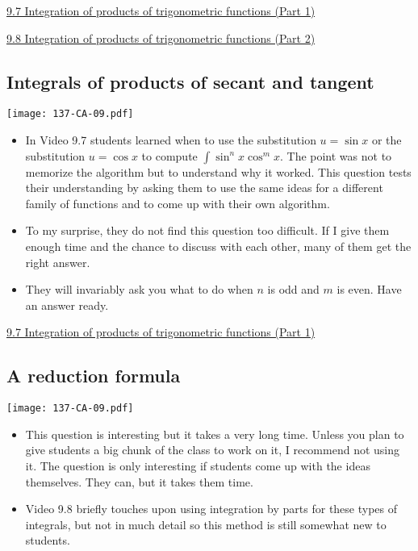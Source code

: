 \documentclass[11pt]{article}
\newcommand {\DS} [1] {${\displaystyle #1}$}
\newcommand{\nl}{\hfill \vspace{-1.1\baselineskip}} %
\newcommand{\vvii}{\hspace{8mm} \href{https://www.youtube.com/watch?v=8TCGSagLskc&list=PLlwePzQY_wW_DPAQSBjQmMs0hF8T7yVkF&index=7}{9.7 Integration of products of trigonometric functions (Part 1)}}
\newcommand{\vviii}{\hspace{8mm} \href{https://www.youtube.com/watch?v=zrPCAP9-0wo&list=PLlwePzQY_wW_DPAQSBjQmMs0hF8T7yVkF&index=8}{9.8 Integration of products of trigonometric functions (Part 2)}}
\begin{document}
\begin{videos}
\vvii

\vviii
\end{videos}

\newpage
\subsection{Integrals of products of secant and tangent}

\begin{center}
{ \texttt{[image: 137-CA-09.pdf]}} 
\end{center}

\begin{comments}
\nl
	\begin{itemize}
		\item In Video 9.7 students learned when to use the substitution \DS{u=\sin x} or the substitution \DS{u= \cos x} to compute \DS{\int \sin^n x \cos^m x}.  The point was not to memorize the algorithm but to understand why it worked.  This question tests their understanding by asking them to use the same ideas for a different family of functions and to come up with their own algorithm.
		\item To my surprise, they do not find this question too difficult.  If I give them enough time and the chance to discuss with each other, many of them get the right answer.
		\item They will invariably ask you what to do when $n$ is odd and $m$ is even.  Have an answer ready.
	\end{itemize}
\end{comments}

\begin{videos}
\vvii
\end{videos}

\newpage
\subsection{A reduction formula}

\begin{center}
{ \texttt{[image: 137-CA-09.pdf]}} 
\end{center}

\begin{comments}
\nl
	\begin{itemize}
		\item This question is interesting but it takes a very long time.  Unless you plan to give students a big chunk of the class to work on it, I recommend not using it.   The question is only interesting if students come up with the ideas themselves.  They can, but it takes them time.
		\item  Video 9.8 briefly touches upon using integration by parts for these types of integrals, but not in much detail so this method is still somewhat new to students.
	\end{itemize}
\end{comments}
\end{document}
